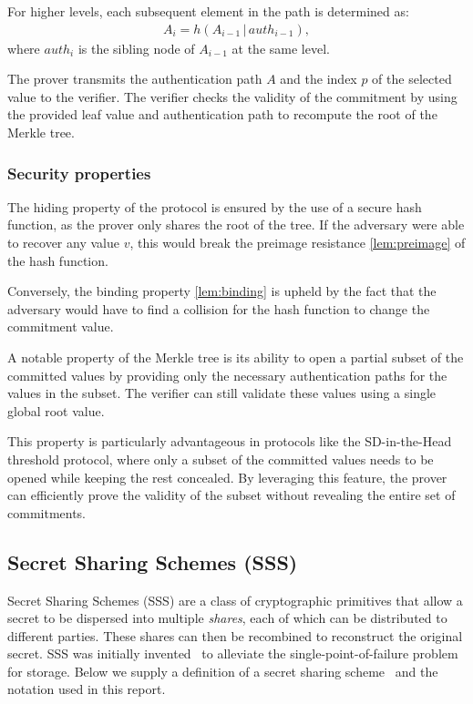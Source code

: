 \documentclass[11pt]{report}
\theoremstyle{definition}
\theoremstyle{plain}
\begin{document}
For higher levels, each subsequent element in the path is determined as:
\begin{align*}
  A_i = h(A_{i-1} \, | \, auth_{i-1}),
\end{align*}
where $auth_i$ is the sibling node of $A_{i-1}$ at the same level.

The prover transmits the authentication path $A$ and the index $p$ of the selected value to the verifier. The verifier checks the validity of the commitment by using the provided leaf value and authentication path to recompute the root of the Merkle tree.

\subsubsection{Security properties}

The hiding property of the protocol is ensured by the use of a secure hash function, as the prover only shares the root of the tree. If the adversary were able to recover any value $v$, this would break the preimage resistance \autoref{lem:preimage} of the hash function.

Conversely, the binding property \autoref{lem:binding} is upheld by the fact that the adversary would have to find a collision for the hash function to change the commitment value.

A notable property of the Merkle tree is its ability to open a partial subset of the committed values by providing only the necessary authentication paths for the values in the subset. The verifier can still validate these values using a single global root value.

This property is particularly advantageous in protocols like the SD-in-the-Head threshold protocol, where only a subset of the committed values needs to be opened while keeping the rest concealed. By leveraging this feature, the prover can efficiently prove the validity of the subset without revealing the entire set of commitments.

\subsection{Secret Sharing Schemes (SSS)}

Secret Sharing Schemes (SSS) are a class of cryptographic primitives that allow a secret to be dispersed into multiple \textit{shares}, each of which can be distributed to different parties. These shares can then be recombined to reconstruct the original secret. SSS was initially invented~\cite{shamir1979share} to alleviate the single-point-of-failure problem for storage. Below we supply a definition of a secret sharing scheme~\cite{cramer2015secure} and the notation used in this report.
\end{document}
